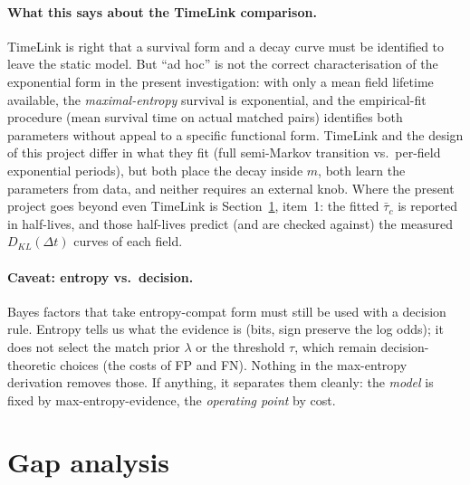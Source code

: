 \documentclass[11pt]{article}
\newcommand{\dt}{\Delta t}
\begin{document}
\paragraph{What this says about the TimeLink comparison.}
TimeLink is right that a survival form and a decay curve must be identified to leave the
static model. But ``ad hoc'' is not the correct characterisation of the exponential form
in the present investigation: with only a mean field lifetime available, the
\emph{maximal-entropy} survival is exponential, and the empirical-fit procedure
(mean survival time on actual matched pairs) identifies both parameters without
appeal to a specific functional form. TimeLink and the design of this project differ in
what they fit (full semi-Markov transition vs.\ per-field exponential periods), but both
place the decay inside $m$, both learn the parameters from data, and neither requires
an external knob. Where the present project goes beyond even TimeLink is
Section~\ref{sec:gap}, item~1: the fitted $\bar\tau_c$ is reported in half-lives, and
those half-lives predict (and are checked against) the measured $D_{KL}(\dt)$ curves
of each field.

\paragraph{Caveat: entropy vs.\ decision.}
Bayes factors that take entropy-compat form must still be used with a decision rule.
Entropy tells us what the evidence is (bits, sign preserve the log odds); it does not
select the match prior $\lambda$ or the threshold $\tau$, which remain decision-theoretic
choices (the costs of FP and FN). Nothing in the max-entropy derivation removes those. If anything,
it separates them cleanly: the \emph{model} is fixed by max-entropy-evidence, the
\emph{operating point} by cost.

\section{Gap analysis}
\label{sec:gap}
\end{document}
